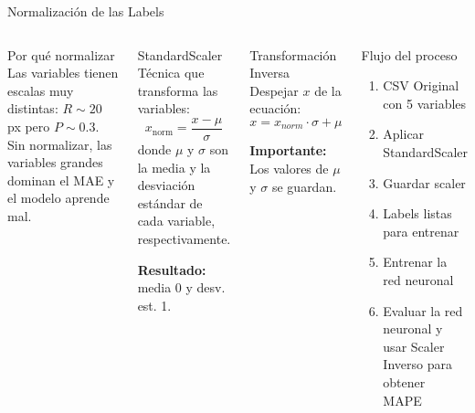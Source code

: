 \documentclass[aspectratio=169, 10pt]{beamer}
\begin{document}
\begin{frame}{Normalización de las Labels}
    \begin{columns}[T]
        
        \begin{block}{Por qué normalizar}
            Las variables tienen escalas muy distintas: $R \sim 20$ \, px pero  $P \sim 0.3$. Sin normalizar, las variables grandes dominan el MAE y el modelo aprende mal.
        \end{block}

        \begin{exampleblock}{StandardScaler}
            Técnica que transforma las variables:
            $$x_{\text{norm}} = \frac{x - \mu}{\sigma}$$
            donde $\mu$ y $\sigma$ son la media y la desviación estándar de cada variable, respectivamente.
            
            \textbf{Resultado:} media 0 y desv. est. 1.
        \end{exampleblock}
        
        
        \begin{exampleblock}{Transformación Inversa}
            Despejar $x$ de la ecuación:
            $$x = x_{norm} \cdot \sigma + \mu$$
            
            \textbf{Importante:} Los valores de $\mu$ y $\sigma$ se guardan.
        \end{exampleblock}
        
        \begin{block}{Flujo del proceso}
            \small
            \begin{enumerate}
                \item CSV Original con 5 variables
                \item Aplicar StandardScaler
                \item Guardar scaler
                \item Labels listas para entrenar
                \item Entrenar la red neuronal
                \item Evaluar la red neuronal y usar Scaler Inverso para obtener MAPE
            \end{enumerate}
        \end{block}
    \end{columns}
\end{frame}
\end{document}
